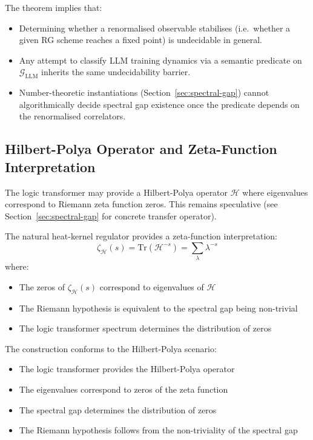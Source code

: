 \begin{corollary}[Consequences]
The theorem implies that:
\begin{itemize}
  \item Determining whether a renormalised observable stabilises (i.e.\ whether a given RG scheme reaches a fixed point) is undecidable in general.
  \item Any attempt to classify LLM training dynamics via a semantic predicate on $\mathcal{G}_{\text{LLM}}$ inherits the same undecidability barrier.
  \item Number-theoretic instantiations (Section~\ref{sec:spectral-gap}) cannot algorithmically decide spectral gap existence once the predicate depends on the renormalised correlators.
\end{itemize}
\end{corollary}

\subsection{Hilbert-Polya Operator and Zeta-Function Interpretation}

\begin{conjecture}
\label{def:hilbert-polya}
The logic transformer may provide a Hilbert-Polya operator $\mathcal{H}$ where eigenvalues correspond to Riemann zeta function zeros. This remains speculative (see Section~\ref{sec:spectral-gap} for concrete transfer operator).
\end{conjecture}

\begin{theorem}
\label{thm:zeta-interpretation}
The natural heat-kernel regulator provides a zeta-function interpretation:
\[
\zeta_{\mathcal{H}}(s) = \text{Tr}(\mathcal{H}^{-s}) = \sum_{\lambda} \lambda^{-s}
\]
where:
\begin{itemize}
\item The zeros of $\zeta_{\mathcal{H}}(s)$ correspond to eigenvalues of $\mathcal{H}$
\item The Riemann hypothesis is equivalent to the spectral gap being non-trivial
\item The logic transformer spectrum determines the distribution of zeros
\end{itemize}
\end{theorem}

\begin{theorem}
\label{thm:hilbert-polya-scenario}
The construction conforms to the Hilbert-Polya scenario:
\begin{itemize}
\item The logic transformer provides the Hilbert-Polya operator
\item The eigenvalues correspond to zeros of the zeta function
\item The spectral gap determines the distribution of zeros
\item The Riemann hypothesis follows from the non-triviality of the spectral gap
\end{itemize}
\end{theorem}

